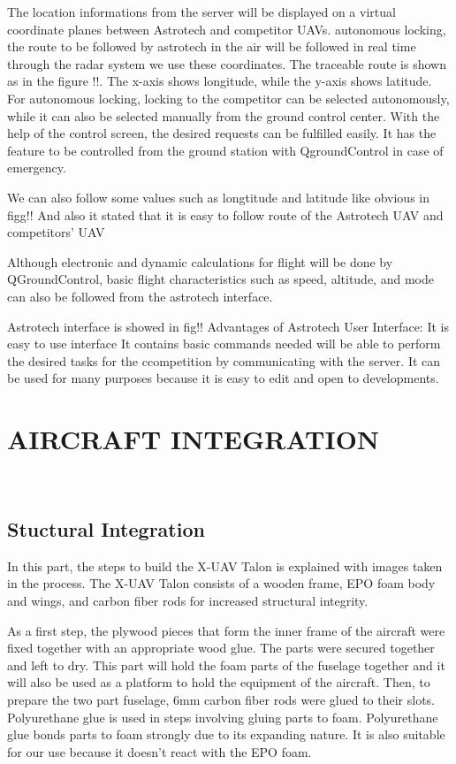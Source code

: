\documentclass[12pt]{article}
\begin{document}
       The location informations from the server will be displayed on a virtual coordinate planes between Astrotech and competitor UAVs. autonomous locking, the route to be followed by astrotech in the air will be followed in real time through the radar system we use these coordinates. The traceable route is shown as in the figure !!. The x-axis shows longitude, while the y-axis shows latitude.
      For autonomous locking, locking to the competitor can be selected autonomously, while it can also be selected manually from the ground control center.
      With the help of the control screen, the desired requests can be fulfilled easily. It has the feature to be controlled from the ground station with QgroundControl in case of emergency.



         We can also follow some values such as longtitude and latitude like obvious in figg!!
And also it stated that  it is easy to follow route of the Astrotech UAV and competitors’ UAV

         Although electronic and dynamic calculations for flight will be done by QGroundControl, basic flight characteristics such as speed, altitude, and mode can also be followed from the astrotech interface.

Astrotech interface is showed in fig!! Advantages of Astrotech User Interface:
It is easy to use interface
It contains basic commands needed will be able to perform the desired tasks for the ccompetition by communicating with the server.
It can be used for many purposes because it is easy to edit and open to developments.



\section{AIRCRAFT INTEGRATION}
\

\subsection{Stuctural Integration}
In this part, the steps to build the X-UAV Talon is explained with images taken in the process. The X-UAV Talon consists of a wooden frame, EPO foam body and wings, and carbon fiber rods for increased structural integrity.

As a first step, the plywood pieces that form the inner frame of the aircraft were fixed together with an appropriate wood glue. The parts were secured together and left to dry. This part will hold the foam parts of the fuselage together and it will also be used as a platform to hold the equipment of the aircraft. Then, to prepare the two part fuselage, 6mm carbon fiber rods were glued to their slots. Polyurethane glue is used in steps involving gluing parts to foam. Polyurethane glue bonds parts to foam strongly due to its expanding nature. It is also suitable for our use because it doesn’t react with the EPO foam.
\end{document}
